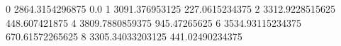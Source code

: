 0 2864.3154296875 0.0
1 3091.376953125 227.0615234375
2 3312.9228515625 448.607421875
4 3809.7880859375 945.47265625
6 3534.93115234375 670.61572265625
8 3305.34033203125 441.02490234375
